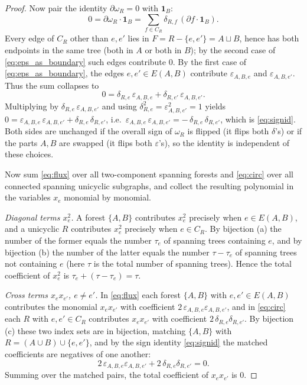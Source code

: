 \begin{proof}
Now pair the identity $\partial\omega_R=0$ with $\mathbf 1_B$:
\[
0=\partial\omega_R\cdot\mathbf 1_B
=\sum_{f\in C_R}\delta_{R,f}\,(\partial f\cdot\mathbf 1_B).
\]
Every edge of $C_R$ other than $e,e'$ lies in $F=R-\{e,e'\}=A\sqcup B$, hence has both
endpoints in the same tree (both in $A$ or both in $B$); by the second case of
\eqref{eq:eps_as_boundary} such edges contribute $0$.  By the first case of
\eqref{eq:eps_as_boundary}, the edges $e,e'\in E(A,B)$ contribute $\varepsilon_{A,B,e}$ and
$\varepsilon_{A,B,e'}$.  Thus the sum collapses to
\[
0=\delta_{R,e}\,\varepsilon_{A,B,e}+\delta_{R,e'}\,\varepsilon_{A,B,e'} .
\]
Multiplying by $\delta_{R,e}\,\varepsilon_{A,B,e'}$ and using
$\delta_{R,e}^2=\varepsilon_{A,B,e'}^2=1$ yields
$0=\varepsilon_{A,B,e}\,\varepsilon_{A,B,e'}+\delta_{R,e}\,\delta_{R,e'}$, i.e.\
$\varepsilon_{A,B,e}\,\varepsilon_{A,B,e'}=-\,\delta_{R,e}\,\delta_{R,e'}$, which is
\eqref{eq:signid}.  Both sides are unchanged if the overall sign of $\omega_R$ is flipped (it
flips both $\delta$'s) or if the parts $A,B$ are swapped (it flips both $\varepsilon$'s), so
the identity is independent of these choices.

Now sum \eqref{eq:flux} over all two-component spanning forests and \eqref{eq:circ} over
all connected spanning unicyclic subgraphs, and collect the resulting polynomial in the
variables $x_e$ monomial by monomial.

\emph{Diagonal terms $x_e^2$.}  A forest $\{A,B\}$ contributes $x_e^2$ precisely when
$e\in E(A,B)$, and a unicyclic $R$ contributes $x_e^2$ precisely when $e\in C_R$.  By
bijection (a) the number of the former equals the number $\tau_e$ of spanning trees
containing $e$, and by bijection (b) the number of the latter equals the number $\tau-\tau_e$
of spanning trees not containing $e$ (here $\tau$ is the total number of spanning trees).
Hence the total coefficient of $x_e^2$ is $\tau_e+(\tau-\tau_e)=\tau$.

\emph{Cross terms $x_ex_{e'}$, $e\ne e'$.}  In \eqref{eq:flux} each forest $\{A,B\}$ with
$e,e'\in E(A,B)$ contributes the monomial $x_ex_{e'}$ with coefficient
$2\,\varepsilon_{A,B,e}\varepsilon_{A,B,e'}$, and in \eqref{eq:circ} each $R$ with
$e,e'\in C_R$ contributes $x_ex_{e'}$ with coefficient $2\,\delta_{R,e}\delta_{R,e'}$.  By
bijection (c) these two index sets are in bijection, matching $\{A,B\}$ with
$R=(A\cup B)\cup\{e,e'\}$, and by the sign identity \eqref{eq:signid} the matched
coefficients are negatives of one another:
\[
2\,\varepsilon_{A,B,e}\varepsilon_{A,B,e'}+2\,\delta_{R,e}\delta_{R,e'}=0 .
\]
Summing over the matched pairs, the total coefficient of $x_ex_{e'}$ is $0$.


\end{proof}

